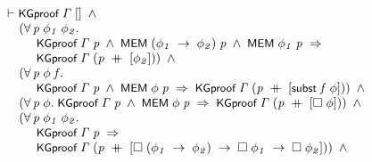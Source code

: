 \documentclass[letterpaper]{article}
\renewcommand{\HOLConst}[1]{{\textsf{\upshape\small #1}}}
\newenvironment{holmath}{\begin{displaymath}\begin{array}{l}}{\end{array}\end{displaymath}\ignorespacesafterend}
\begin{document}
\begin{holmath}
  \ensuremath{\HOLTokenTurnstile}\HOLConst{KGproof}\;\HOLFreeVar{\ensuremath{\Gamma}}\;[]\;\HOLSymConst{\HOLTokenConj{}}\\
\;\;\;\;\;(\HOLSymConst{\HOLTokenForall{}}\HOLBoundVar{p}\;\HOLBoundVar{\ensuremath{\phi\sb{1}}}\;\HOLBoundVar{\ensuremath{\phi\sb{2}}}.\\
\;\;\;\;\;\;\;\;\;\;\HOLConst{KGproof}\;\HOLFreeVar{\ensuremath{\Gamma}}\;\HOLBoundVar{p}\;\HOLSymConst{\HOLTokenConj{}}\;\HOLConst{MEM}\;(\HOLBoundVar{\ensuremath{\phi\sb{1}}}\;\HOLSymConst{\ensuremath{\rightarrow}}\;\HOLBoundVar{\ensuremath{\phi\sb{2}}})\;\HOLBoundVar{p}\;\HOLSymConst{\HOLTokenConj{}}\;\HOLConst{MEM}\;\HOLBoundVar{\ensuremath{\phi\sb{1}}}\;\HOLBoundVar{p}\;\HOLSymConst{\HOLTokenImp{}}\\
\;\;\;\;\;\;\;\;\;\;\HOLConst{KGproof}\;\HOLFreeVar{\ensuremath{\Gamma}}\;(\HOLBoundVar{p}\;\HOLSymConst{\HOLTokenDoublePlus}\;[\HOLBoundVar{\ensuremath{\phi\sb{2}}}]))\;\HOLSymConst{\HOLTokenConj{}}\\
\;\;\;\;\;(\HOLSymConst{\HOLTokenForall{}}\HOLBoundVar{p}\;\HOLBoundVar{\ensuremath{\phi}}\;\HOLBoundVar{f}.\\
\;\;\;\;\;\;\;\;\;\;\HOLConst{KGproof}\;\HOLFreeVar{\ensuremath{\Gamma}}\;\HOLBoundVar{p}\;\HOLSymConst{\HOLTokenConj{}}\;\HOLConst{MEM}\;\HOLBoundVar{\ensuremath{\phi}}\;\HOLBoundVar{p}\;\HOLSymConst{\HOLTokenImp{}}\;\HOLConst{KGproof}\;\HOLFreeVar{\ensuremath{\Gamma}}\;(\HOLBoundVar{p}\;\HOLSymConst{\HOLTokenDoublePlus}\;[\HOLConst{subst}\;\HOLBoundVar{f}\;\HOLBoundVar{\ensuremath{\phi}}]))\;\HOLSymConst{\HOLTokenConj{}}\\
\;\;\;\;\;(\HOLSymConst{\HOLTokenForall{}}\HOLBoundVar{p}\;\HOLBoundVar{\ensuremath{\phi}}.\;\HOLConst{KGproof}\;\HOLFreeVar{\ensuremath{\Gamma}}\;\HOLBoundVar{p}\;\HOLSymConst{\HOLTokenConj{}}\;\HOLConst{MEM}\;\HOLBoundVar{\ensuremath{\phi}}\;\HOLBoundVar{p}\;\HOLSymConst{\HOLTokenImp{}}\;\HOLConst{KGproof}\;\HOLFreeVar{\ensuremath{\Gamma}}\;(\HOLBoundVar{p}\;\HOLSymConst{\HOLTokenDoublePlus}\;[\HOLSymConst{\ensuremath{\Box}}\;\HOLBoundVar{\ensuremath{\phi}}]))\;\HOLSymConst{\HOLTokenConj{}}\\
\;\;\;\;\;(\HOLSymConst{\HOLTokenForall{}}\HOLBoundVar{p}\;\HOLBoundVar{\ensuremath{\phi\sb{1}}}\;\HOLBoundVar{\ensuremath{\phi\sb{2}}}.\\
\;\;\;\;\;\;\;\;\;\;\HOLConst{KGproof}\;\HOLFreeVar{\ensuremath{\Gamma}}\;\HOLBoundVar{p}\;\HOLSymConst{\HOLTokenImp{}}\\
\;\;\;\;\;\;\;\;\;\;\HOLConst{KGproof}\;\HOLFreeVar{\ensuremath{\Gamma}}\;(\HOLBoundVar{p}\;\HOLSymConst{\HOLTokenDoublePlus}\;[\HOLSymConst{\ensuremath{\Box}}\;(\HOLBoundVar{\ensuremath{\phi\sb{1}}}\;\HOLSymConst{\ensuremath{\rightarrow}}\;\HOLBoundVar{\ensuremath{\phi\sb{2}}})\;\HOLSymConst{\ensuremath{\rightarrow}}\;\HOLSymConst{\ensuremath{\Box}}\;\HOLBoundVar{\ensuremath{\phi\sb{1}}}\;\HOLSymConst{\ensuremath{\rightarrow}}\;\HOLSymConst{\ensuremath{\Box}}\;\HOLBoundVar{\ensuremath{\phi\sb{2}}}]))\;\HOLSymConst{\HOLTokenConj{}}\\

\end{holmath}
\end{document}
